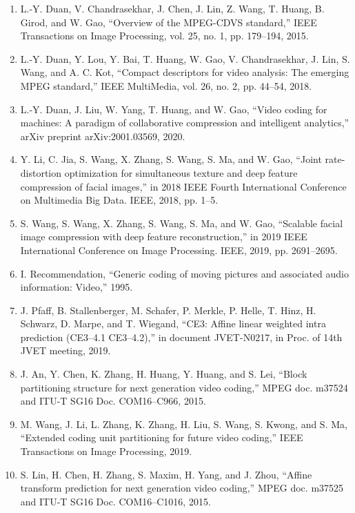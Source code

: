 \documentclass{article}
\begin{document}
\begin{enumerate}
	\item L.-Y. Duan, V. Chandrasekhar, J. Chen, J. Lin, Z. Wang, T. Huang,
	B. Girod, and W. Gao, “Overview of the MPEG-CDVS standard,” IEEE
	Transactions on Image Processing, vol. 25, no. 1, pp. 179–194, 2015.
	
	\item L.-Y. Duan, Y. Lou, Y. Bai, T. Huang, W. Gao, V. Chandrasekhar, J. Lin,
	S. Wang, and A. C. Kot, “Compact descriptors for video analysis: The
	emerging MPEG standard,” IEEE MultiMedia, vol. 26, no. 2, pp. 44–54,
	2018.
	
	\item L.-Y. Duan, J. Liu, W. Yang, T. Huang, and W. Gao, “Video coding
	for machines: A paradigm of collaborative compression and intelligent
	analytics,” arXiv preprint arXiv:2001.03569, 2020.	

	\item Y. Li, C. Jia, S. Wang, X. Zhang, S. Wang, S. Ma, and W. Gao, “Joint
	rate-distortion optimization for simultaneous texture and deep feature
	compression of facial images,” in 2018 IEEE Fourth International
	Conference on Multimedia Big Data. IEEE, 2018, pp. 1–5.

	\item S. Wang, S. Wang, X. Zhang, S. Wang, S. Ma, and W. Gao, “Scalable
	facial image compression with deep feature reconstruction,” in 2019
	IEEE International Conference on Image Processing. IEEE, 2019, pp.
	2691–2695.

	\item I. Recommendation, “Generic coding of moving pictures and associated
	audio information: Video,” 1995.

	\item J. Pfaff, B. Stallenberger, M. Schafer, P. Merkle, P. Helle, T. Hinz,
	H. Schwarz, D. Marpe, and T. Wiegand, “CE3: Affine linear weighted
	intra prediction (CE3–4.1 CE3–4.2),” in document JVET-N0217, in Proc.
	of 14th JVET meeting, 2019.

	\item J. An, Y. Chen, K. Zhang, H. Huang, Y. Huang, and S. Lei, “Block
	partitioning structure for next generation video coding,” MPEG doc.
	m37524 and ITU-T SG16 Doc. COM16–C966, 2015.

	\item M. Wang, J. Li, L. Zhang, K. Zhang, H. Liu, S. Wang, S. Kwong,
	and S. Ma, “Extended coding unit partitioning for future video coding,”
	IEEE Transactions on Image Processing, 2019.

	\item S. Lin, H. Chen, H. Zhang, S. Maxim, H. Yang, and J. Zhou, “Affine
	transform prediction for next generation video coding,” MPEG doc.
	m37525 and ITU-T SG16 Doc. COM16–C1016, 2015.


\end{enumerate}
\end{document}
